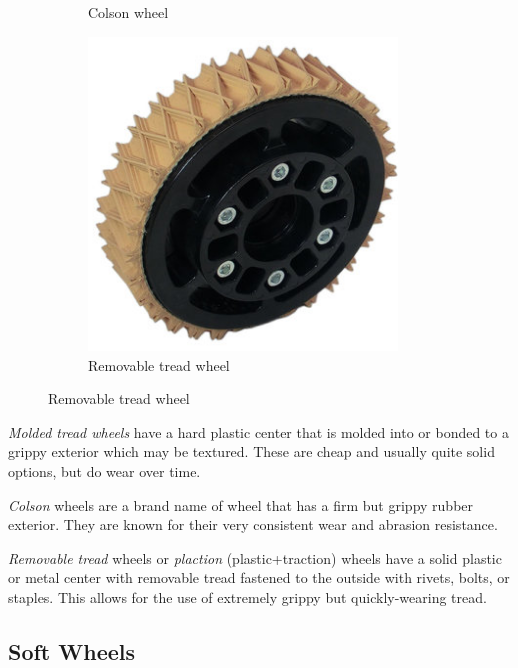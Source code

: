\begin{figure}[H]
\begin{subfigure}[b]{.24\linewidth}
			\caption{Colson wheel}
		\end{subfigure}\begin{subfigure}[b]{.24\linewidth}
			\includegraphics[width=0.9\textwidth]{imgs/wheel_plaction.png}
			\caption{Removable tread wheel}
		\end{subfigure}
	\end{figure}
		
	\begin{asparaenum}[a)] 
		\item \textit{Molded tread wheels} have a hard plastic center that is molded into or bonded to a grippy exterior which may be textured. These are cheap and usually quite solid options, but do wear over time.
		\item \textit{Colson} wheels are a brand name of wheel that has a firm but grippy rubber exterior. They are known for their very consistent wear and abrasion resistance.
		\item \textit{Removable tread} wheels or \textit{plaction} (plastic+traction) wheels have a solid plastic or metal center with removable tread fastened to the outside with rivets, bolts, or staples. This allows for the use of extremely grippy but quickly-wearing tread.
	\end{asparaenum}
	
	\subsection{Soft Wheels}	
	
